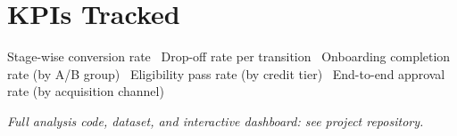 \documentclass[10pt]{article}
\begin{document}
\section*{KPIs Tracked}
Stage-wise conversion rate \textbar\ Drop-off rate per transition \textbar\ Onboarding completion rate (by A/B group) \textbar\ Eligibility pass rate (by credit tier) \textbar\ End-to-end approval rate (by acquisition channel)

\vspace{8pt}
\textit{\small Full analysis code, dataset, and interactive dashboard: see project repository.}
\end{document}
